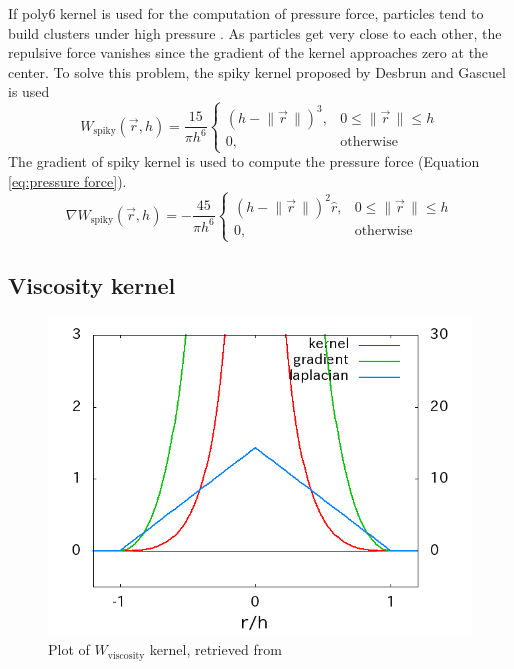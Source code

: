 \documentclass[a4paper, 12pt, oneside]{book}
\begin{document}
\begin{doublespace}
    If poly6 kernel is used for the computation of pressure force, particles tend to build clusters under high pressure \cite{muller2003}. As particles get very close to each other, the repulsive force vanishes since the gradient of the kernel approaches zero at the center. To solve this problem, the spiky kernel proposed by Desbrun and Gascuel \cite{desbrun1996} is used
    \begin{equation}
        W_{\mathrm{spiky}} (\vec{r}, h) = \frac{15} {\pi h^{6}}
        \begin{cases}
             (h - \lVert\vec{r}\,\rVert)^{3}, & 0 \leq \lVert\vec{r}\,\rVert \leq h \\
            0, & \mathrm{otherwise}
        \end{cases}
    \end{equation}
    The gradient of spiky kernel is used to compute the pressure force (Equation \ref{eq:pressure force}).
    \begin{equation}
        \nabla W_{\mathrm{spiky}} (\vec{r}, h) = - \frac{45}{\pi h^{6}}
        \begin{cases}
            (h - \lVert\vec{r}\,\rVert)^{2} \hat{r}, & 0 \leq \lVert\vec{r}\,\rVert \leq h \\
            0, & \mathrm{otherwise}
        \end{cases}
    \end{equation}
\end{doublespace}

\subsection{Viscosity kernel}

\begin{figure}[H]
    \centering
    \includegraphics[width=0.6\linewidth]{images/kernel_viscosity.png}
    \caption{Plot of \(W_{\mathrm{viscosity}}\) kernel, retrieved from \cite{web:pukiwiki_kernel_functions}}
\end{figure}
\end{document}
